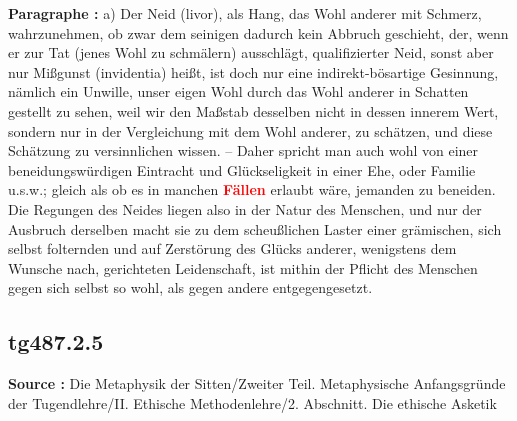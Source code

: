 \documentclass[a4paper,12pt,twoside]{book}
\newcommand{\match}[1]{\textcolor{red}{\textbf{#1}}}
\begin{document}
	\textbf{Paragraphe : }a) Der Neid (livor), als Hang, das Wohl anderer mit Schmerz, wahrzunehmen, ob zwar dem seinigen dadurch kein Abbruch geschieht, der, wenn er zur Tat (jenes Wohl zu schmälern) ausschlägt, qualifizierter Neid, sonst aber nur Mißgunst (invidentia) heißt, ist doch nur eine indirekt-bösartige Gesinnung, nämlich ein Unwille, unser eigen Wohl durch das Wohl anderer in Schatten gestellt zu sehen, weil wir den Maßstab desselben nicht in dessen innerem Wert, sondern nur in der Vergleichung mit dem Wohl anderer, zu schätzen, und diese Schätzung zu versinnlichen wissen. – Daher spricht man auch wohl von einer beneidungswürdigen Eintracht und Glückseligkeit in einer Ehe, oder Familie u.s.w.; gleich als ob es in manchen \match{Fällen} erlaubt wäre, jemanden zu beneiden. Die Regungen des Neides liegen also in der Natur des Menschen, und nur der Ausbruch derselben macht sie zu dem scheußlichen Laster einer grämischen, sich selbst folternden und auf Zerstörung des Glücks anderer, wenigstens dem Wunsche nach, gerichteten Leidenschaft, ist mithin der Pflicht des Menschen gegen sich selbst so wohl, als gegen andere entgegengesetzt. 
	
	\subsection*{tg487.2.5} 
	\textbf{Source : }Die Metaphysik der Sitten/Zweiter Teil. Metaphysische Anfangsgründe der Tugendlehre/II. Ethische Methodenlehre/2. Abschnitt. Die ethische Asketik\\  
	
\end{document}
